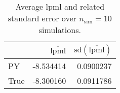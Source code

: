 \begin{table}[H]

\caption{Average lpml and related standard error over $n_{\text{sim}} = 10$ simulations.}
\centering
\begin{tabular}[t]{lrr}
\toprule
  & $\overbar{\text{lpml}}$ & $\text{sd}(\overbar{\text{lpml}})$\\
\midrule
PY & -8.534414 & 0.0900237\\
True & -8.300160 & 0.0911786\\
\bottomrule
\end{tabular}
\end{table}